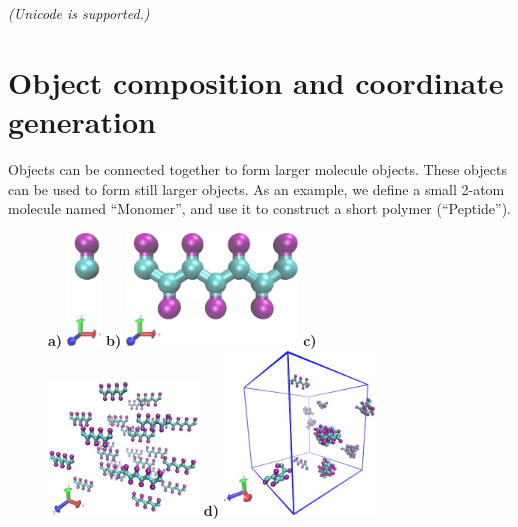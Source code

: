 \documentclass[11pt]{article}
\begin{document}
\textit{(Unicode is supported.)}



\pagebreak
\section{ Object composition and coordinate generation }
\label{sec:coordinates}


Objects can be connected together to form larger molecule objects.
These objects can be used to form still larger objects.
As an example, we define a small 2-atom molecule named ``Monomer'',
and use it to construct a short polymer (``Peptide'').

\begin{figure}[htbp]
\centering
\textbf{a)}
\includegraphics[height=3cm]{2bead_residue.jpg}
\quad \quad \quad \quad \quad
\textbf{b)}
\includegraphics[height=3cm]{2bead_peptide.jpg}
\newline
\vspace{10 mm}
\newline
\textbf{c)}
\includegraphics[width=4cm]{2bead_peptides_nopbc_t=0_LR.jpg}
\textbf{d)}
\includegraphics[width=4cm]{2bead_peptides_t=100ps_LR.jpg}

\end{figure}
\end{document}
